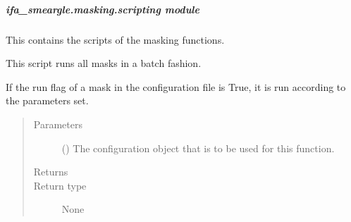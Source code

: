 \documentclass[letterpaper,10pt,english]{sphinxmanual}
\begin{document}
\subparagraph{ifa\_smeargle.masking.scripting module}
\label{\detokenize{docstrings/ifa_smeargle.masking.scripting:module-ifa_smeargle.masking.scripting}}\label{\detokenize{docstrings/ifa_smeargle.masking.scripting:ifa-smeargle-masking-scripting-module}}\label{\detokenize{docstrings/ifa_smeargle.masking.scripting::doc}}
This contains the scripts of the masking functions.

\begin{fulllineitems}
\label{\detokenize{docstrings/ifa_smeargle.masking.scripting:ifa_smeargle.masking.scripting.script_batch_masking}}
This script runs all masks in a batch fashion.

If the run flag of a mask in the configuration file is True,
it is run according to the parameters set.
\begin{quote}\begin{description}
\item[{Parameters}] \leavevmode
{} () \textendash{} The configuration object that is to be used for this
function.

\item[{Returns}] \leavevmode


\item[{Return type}] \leavevmode
None

\end{description}\end{quote}

\end{fulllineitems}

\end{document}
